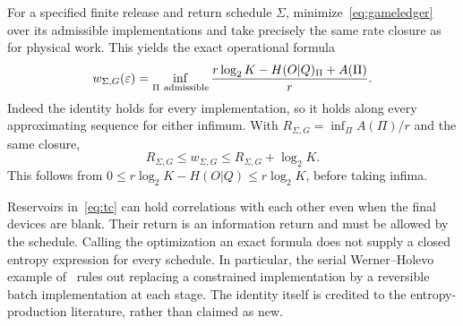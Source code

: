 For a specified finite release and return schedule $\Sigma$, minimize~\eqref{eq:gameledger} over its admissible implementations and take precisely the same rate closure as for physical work. This yields the exact operational formula
\begin{equation}
 w_{\Sigma,G}(\varepsilon)=\inf_{\Pi\ {\rm admissible}}
 \frac{r\log_2K-H(O|Q)_\Pi+A(\Pi)}r.\label{eq:operational}
\end{equation}
Indeed the identity holds for every implementation, so it holds along every approximating sequence for either infimum. With $R_{\Sigma,G}=\inf_\Pi A(\Pi)/r$ and the same closure,
\begin{equation}
 R_{\Sigma,G}\le w_{\Sigma,G}\le R_{\Sigma,G}+\log_2K.\label{eq:reservoir}
\end{equation}
This follows from $0\le r\log_2K-H(O|Q)\le r\log_2K$, before taking infima.

Reservoirs in~\eqref{eq:tc} can hold correlations with each other even when the final devices are blank. Their return is an information return and must be allowed by the schedule. Calling the optimization an exact formula does not supply a closed entropy expression for every schedule. In particular, the serial Werner--Holevo example of~\cite[Theorem 3 and Section 5]{waiting} rules out replacing a constrained implementation by a reversible batch implementation at each stage. The identity itself is credited to the entropy-production literature, rather than claimed as new.
